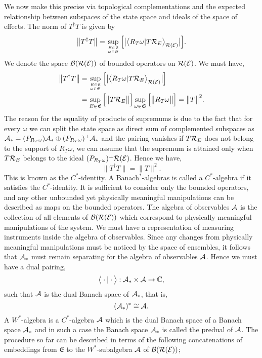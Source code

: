\documentclass[11pt]{article}
\begin{document}
We now make this precise via topological complementations and the expected relationship between subspaces of the state space and ideals of the space of effects. The norm of $T^\dagger T$ is given by
$$\big\| T^\dagger T\big\|=\sup_{E\in \mathfrak{E}\atop\omega\in \mathfrak{S}}\Big[ \big|\big\langle R_T\omega|T\mathcal{R}_E\big\rangle_{\mathcal{R}(\mathcal{E})}\big| \Big].$$
We denote the space ${\mathcal{B}(\mathcal{R}(\mathcal{E}))}$ of bounded operators on $\mathcal{R}(\mathcal{E})$. We must have,
\begin{align*}
	\big\| T^\dagger T\big\|&=\sup_{E\in \mathfrak{E}\atop\omega\in \mathfrak{S}}\Big[ \big|\big\langle R_T\omega|T\mathcal{R}_E\big\rangle_{\mathcal{R}(\mathcal{E})}\big| \Big]\\&=\sup_{E\in \mathfrak{E}}\Big[\big\|T\mathcal{R}_E\big\|\Big]\sup_{\omega\in \mathfrak{S}}\Big[\big\|R_T\omega\big\|\Big]=\big\| T\big\|^2.
\end{align*}
The reason for the equality of products of supremums is due to the fact that for every $\omega$ we can split the state space as direct sum of complemented subspaces as 
$\mathcal{A}_* =(P_{R_T\omega})\mathcal{A}_* \oplus ({P_{R_T\omega}})^\perp \mathcal{A}_*$ and the pairing vanishes if $T\mathcal{R}_E$ does not belong to the support of $R_T\omega$, we can assume that the supremum is attained only when $T\mathcal{R}_E$ belongs to the ideal $({P_{R_T\omega}})^\perp \mathcal{R}(\mathcal{E})$. Hence we have,
$$\big\|T^\dagger T\big\|=\big\|T\big\|^2.$$
This is known as the $C^*$-identity. A Banach$^*$-algebras is called a $C^*$-algebra if it satisfies the $C^*$-identity. It is sufficient to consider only the bounded operators, and any other unbounded yet physically meaningful manipulations can be described as maps on the bounded operators. The algebra of observables $\mathcal{A}$ is the collection of all elements of $\mathcal{B}(\mathcal{R}(\mathcal{E}))$ which correspond to physically meaningful manipulations of the system. We must have a representation of measuring instruments inside the algebra of observables. Since any changes from physically meaningful manipulations must be noticed by the space of ensembles, it follows that $\mathcal{A}_*$ must remain separating for the algebra of observables $\mathcal{A}$. Hence we must have a dual pairing,
$$\big\langle\cdot|\cdot\big\rangle:\mathcal{A}_*\times \mathcal{A}\to \mathbb{C},$$
such that $\mathcal{A}$ is the dual Banach space of $\mathcal{A}_*$, that is,
$$(\mathcal{A}_*)^*\cong \mathcal{A}.$$
A $W^*$-algebra is a $C^*$-algebra $\mathcal{A}$ which is the dual Banach space of a Banach space $\mathcal{A}_*$ and in such a case the Banach space $\mathcal{A}_*$ is called the predual of $\mathcal{A}$. The procedure so far can be described in terms of the following concatenations of embeddings from $\mathfrak{E}$ to the $W^*$-subalgebra $\mathcal{A}$ of $\mathcal{B}(\mathcal{R}(\mathcal{E}))$;
\end{document}

